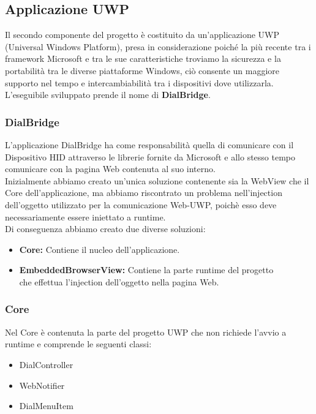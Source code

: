 \subsection{Applicazione UWP}

Il secondo componente del progetto è costituito da un'applicazione UWP (Universal Windows Platform), presa in considerazione poiché la più recente tra i framework Microsoft e tra le sue caratteristiche troviamo la sicurezza e la portabilità tra le diverse piattaforme Windows, ciò consente un maggiore supporto nel tempo e intercambiabilità tra i dispositivi dove utilizzarla. L'eseguibile sviluppato prende il nome di \textbf{DialBridge}.\\

\subsubsection{DialBridge}

L’applicazione DialBridge ha come responsabilità quella di comunicare con il Dispositivo HID attraverso le librerie fornite da Microsoft e allo stesso tempo comunicare con la pagina Web contenuta al suo interno.\\

Inizialmente abbiamo creato un'unica soluzione contenente sia la WebView che il Core dell'applicazione, ma abbiamo riscontrato un problema nell’injection dell'oggetto utilizzato per la comunicazione Web-UWP, poichè esso deve necessariamente essere iniettato a runtime.\\

Di conseguenza abbiamo creato due diverse soluzioni:

\begin{itemize}
\item \textbf{Core:} Contiene il nucleo dell’applicazione.
\item \textbf{EmbeddedBrowserView:} Contiene la parte runtime del progetto\\ che 			effettua l’injection dell’oggetto nella pagina Web.
\end{itemize}

\subsubsection{Core}

Nel Core è contenuta la parte del progetto UWP che non richiede l'avvio a runtime e comprende le seguenti classi:

\begin{itemize}
\item DialController
\item WebNotifier
\item DialMenuItem
\end{itemize}

